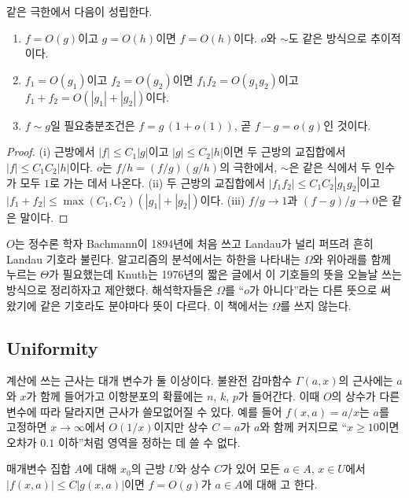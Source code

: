 \begin{proposition}
\label{prop:big-o-rules}
같은 극한에서 다음이 성립한다.
\begin{enumerate}
\item $f=O(g)$이고 $g=O(h)$이면 $f=O(h)$이다. $o$와 $\sim$도 같은 방식으로 추이적이다.
\item $f_1=O(g_1)$이고 $f_2=O(g_2)$이면 $f_1f_2=O(g_1g_2)$이고 $f_1+f_2=O(|g_1|+|g_2|)$이다.
\item $f\sim g$일 필요충분조건은 $f=g\,(1+o(1))$, 곧 $f-g=o(g)$인 것이다.
\end{enumerate}
\end{proposition}

\begin{proof}
(i) 근방에서 $|f|\le C_1|g|$이고 $|g|\le C_2|h|$이면 두 근방의 교집합에서 $|f|\le C_1C_2|h|$이다. $o$는 $f/h=(f/g)(g/h)$의 극한에서, $\sim$은 같은 식에서 두 인수가 모두 $1$로 가는 데서 나온다. (ii) 두 근방의 교집합에서 $|f_1f_2|\le C_1C_2|g_1g_2|$이고 $|f_1+f_2|\le\max(C_1,C_2)(|g_1|+|g_2|)$이다. (iii) $f/g\to1$과 $(f-g)/g\to0$은 같은 말이다.
\end{proof}

\begin{aside}[기호의 역사]
$O$는 정수론 학자 Bachmann이 1894년에 처음 쓰고 Landau가 널리 퍼뜨려 흔히 Landau 기호라 불린다. 알고리즘의 분석에서는 하한을 나타내는 $\Omega$와 위아래를 함께 누르는 $\Theta$가 필요했는데 Knuth는 1976년의 짧은 글에서 이 기호들의 뜻을 오늘날 쓰는 방식으로 정리하자고 제안했다\cite{knuth1976bigomicron}. 해석학자들은 $\Omega$를 ``$o$가 아니다''라는 다른 뜻으로 써 왔기에 같은 기호라도 분야마다 뜻이 다르다. 이 책에서는 $\Omega$를 쓰지 않는다.
\end{aside}

\subsection{Uniformity}

계산에 쓰는 근사는 대개 변수가 둘 이상이다. 불완전 감마함수 $\Gamma(a,x)$의 근사에는 $a$와 $x$가 함께 들어가고 이항분포의 확률에는 $n$, $k$, $p$가 들어간다. 이때 $O$의 상수가 다른 변수에 따라 달라지면 근사가 쓸모없어질 수 있다. 예를 들어 $f(x,a)=a/x$는 $a$를 고정하면 $x\to\infty$에서 $O(1/x)$이지만 상수 $C=a$가 $a$와 함께 커지므로 ``$x\ge10$이면 오차가 $0.1$ 이하''처럼 영역을 정하는 데 쓸 수 없다.

\begin{definition}
\label{def:uniform-o}
매개변수 집합 $A$에 대해 $x_0$의 근방 $U$와 상수 $C$가 있어 모든 $a\in A$, $x\in U$에서 $|f(x,a)|\le C|g(x,a)|$이면 $f=O(g)$가 $a\in A$에 대해 고 한다.
\end{definition}

